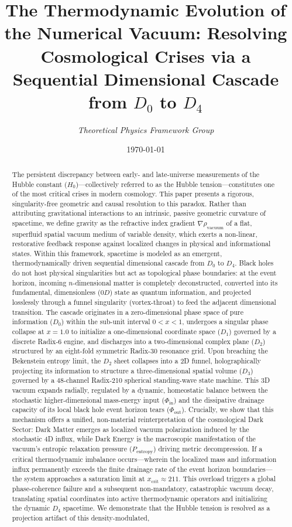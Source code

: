 \documentclass[11pt,a4paper]{article}
\title{\textbf{The Thermodynamic Evolution of the Numerical Vacuum: Resolving Cosmological Crises via a Sequential Dimensional Cascade from $D_0$ to $D_4$}}
\author{\textit{Theoretical Physics Framework Group}}
\date{\today}
\theoremstyle{plain}
\theoremstyle{definition}
\theoremstyle{remark}
\begin{document}
\maketitle

\begin{abstract}
The persistent discrepancy between early- and late-universe measurements of the Hubble constant ($H_0$)—collectively referred to as the Hubble tension—constitutes one of the most critical crises in modern cosmology. This paper presents a rigorous, singularity-free geometric and causal resolution to this paradox. Rather than attributing gravitational interactions to an intrinsic, passive geometric curvature of spacetime, we define gravity as the refractive index gradient $\nabla \rho_{\text{vacuum}}$ of a flat, superfluid spatial vacuum medium of variable density, which exerts a non-linear, restorative feedback response against localized changes in physical and informational states. Within this framework, spacetime is modeled as an emergent, thermodynamically driven sequential dimensional cascade from $D_0$ to $D_4$. Black holes do not host physical singularities but act as topological phase boundaries: at the event horizon, incoming $n$-dimensional matter is completely deconstructed, converted into its fundamental, dimensionless ($0D$) state as quantum information, and projected losslessly through a funnel singularity (vortex-throat) to feed the adjacent dimensional transition. The cascade originates in a zero-dimensional phase space of pure information ($D_0$) within the sub-unit interval $0 < x < 1$, undergoes a singular phase collapse at $x = 1.0$ to initialize a one-dimensional coordinate space ($D_1$) governed by a discrete Radix-6 engine, and discharges into a two-dimensional complex plane ($D_2$) structured by an eight-fold symmetric Radix-30 resonance grid. Upon breaching the Bekenstein entropy limit, the $D_2$ sheet collapses into a 2D funnel, holographically projecting its information to structure a three-dimensional spatial volume ($D_3$) governed by a 48-channel Radix-210 spherical standing-wave state machine. This 3D vacuum expands radially, regulated by a dynamic, homeostatic balance between the stochastic higher-dimensional mass-energy input ($\Phi_{\text{in}}$) and the dissipative drainage capacity of its local black hole event horizon tears ($\Phi_{\text{out}}$). Crucially, we show that this mechanism offers a unified, non-material reinterpretation of the cosmological Dark Sector: Dark Matter emerges as localized vacuum polarization induced by the stochastic 4D influx, while Dark Energy is the macroscopic manifestation of the vacuum's entropic relaxation pressure ($P_{\text{entropy}}$) driving metric decompression. If a critical thermodynamic imbalance occurs—wherein the localized mass and information influx permanently exceeds the finite drainage rate of the event horizon boundaries—the system approaches a saturation limit at $x_{\text{crit}} \approx 211$. This overload triggers a global phase-coherence failure and a subsequent non-mandatory, catastrophic vacuum decay, translating spatial coordinates into active thermodynamic operators and initializing the dynamic $D_4$ spacetime. We demonstrate that the Hubble tension is resolved as a projection artifact of this density-modulated, 
\end{abstract}
\end{document}

